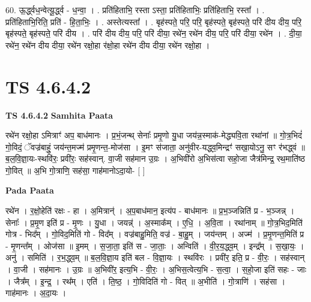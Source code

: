 \documentclass[17pt]{extarticle}
\begin{document}
60. ऊ॒र्द्ध्वध॒न्वेत्यू॒र्द्ध्व - ध॒न्वा॒ । . प्रति॑हिताभि॒ रस्ता ऽस्ता॒ प्रति॑हिताभिः॒ प्रति॑हिताभि॒ रस्ता᳚ । . प्रति॑हिताभि॒रिति॒ प्रति॑ - हि॒ता॒भिः॒ । . अस्तेत्यस्ता᳚ । . बृह॑स्पते॒ परि॒ परि॒ बृह॑स्पते॒ बृह॑स्पते॒ परि॑ दीय दीय॒ परि॒ बृह॑स्पते॒ बृह॑स्पते॒ परि॑ दीय । . परि॑ दीय दीय॒ परि॒ परि॑ दीया॒ रथे॑न॒ रथे॑न दीय॒ परि॒ परि॑ दीया॒ रथे॑न । . दी॒या॒ रथे॑न॒ रथे॑न दीय दीया॒ रथे॑न रक्षो॒हा र॑क्षो॒हा रथे॑न दीय दीया॒ रथे॑न रक्षो॒हा । \newline
\pagebreak
{}

\section{ TS 4.6.4.2 }

\textbf{TS 4.6.4.2 } \newline
\textbf{Samhita Paata} \newline

रथे॑न रक्षो॒हा ऽमित्राꣳ॑ अप॒ बाध॑मानः । प्र॒भं॒जन्थ् सेनाः᳚ प्रमृ॒णो यु॒धा जय॑न्न॒स्माक॑-मेद्ध्यवि॒ता रथा॑नां ॥ गो॒त्र॒भिदं॑ गो॒विदं॒ ॅवज्र॑बाहुं॒ जय॑न्त॒मज्म॑ प्रमृ॒णन्त॒-मोज॑सा । इ॒मꣳ स॑जाता॒ अनु॑वीर-यद्ध्व॒मिन्द्रꣳ॑ सखा॒योऽनु॒ सꣳ र॑भद्ध्वं ॥ ब॒ल॒वि॒ज्ञा॒यः-स्थवि॑रः॒ प्रवी॑रः॒ सह॑स्वान्. वा॒जी सह॑मान उ॒ग्रः । अ॒भिवी॑रो अ॒भिस॑त्वा सहो॒जा जैत्र॑मिन्द्र॒ रथ॒माति॑ष्ठ गो॒वित् ॥ अ॒भि गो॒त्राणि॒ सह॑सा॒ गाह॑मानोऽदा॒यो- [  ] \newline

\textbf{Pada Paata} \newline

रथे॑न । र॒क्षो॒हेति॑ रक्षः - हा । अ॒मित्रान्॑ । अ॒प॒बाध॑मान॒ इत्य॑प - बाध॑मानः ॥ प्र॒भ॒ञ्जन्निति॑ प्र - भ॒ञ्जन्न् । सेनाः᳚ । प्र॒मृ॒ण इति॑ प्र - मृ॒णः । यु॒धा । जयन्न्॑ । अ॒स्माक᳚म् । ए॒धि॒ । अ॒वि॒ता । रथा॑नाम् ॥ गो॒त्र॒भिद॒मिति॑ गोत्र - भिद᳚म् । गो॒विद॒मिति॑ गो - विद᳚म् । वज्र॑बाहु॒मिति॒ वज्र॑ - बा॒हु॒म् । जय॑न्तम् । अज्म॑ । प्र॒मृ॒णन्त॒मिति॑ प्र - मृ॒णन्त᳚म् । ओज॑सा ॥ इ॒मम् । स॒जा॒ता॒ इति॑ स - जा॒ताः॒ । अन्विति॑ । वी॒र॒य॒द्ध्व॒म् । इन्द्र᳚म् । स॒खा॒यः॒ । अनु॑ । समिति॑ । र॒भ॒द्ध्व॒म् ॥ ब॒ल॒वि॒ज्ञा॒य इति॑ बल - वि॒ज्ञा॒यः । स्थवि॑रः । प्रवी॑र॒ इति॒ प्र - वी॒रः॒ । सह॑स्वान् । वा॒जी । सह॑मानः । उ॒ग्रः ॥ अ॒भिवी॑र॒ इत्य॒भि - वी॒रः॒ । अ॒भिस॒त्वेत्य॒भि - स॒त्वा॒ । स॒हो॒जा इति॑ सहः - जाः । जैत्र᳚म् । इ॒न्द्र॒ । रथ᳚म् । एति॑ । ति॒ष्ठ॒ । गो॒विदिति॑ गो - वित् ॥ अ॒भीति॑ । गो॒त्राणि॑ । सह॑सा । गाह॑मानः । अ॒दा॒यः ।  \newline
\end{document}
